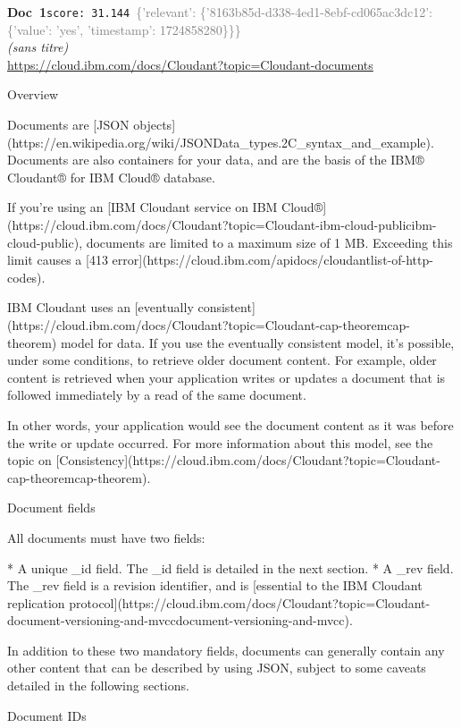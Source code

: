 \documentclass[a4paper,11pt]{article}
\begin{document}
\begin{docenv}
{\footnotesize\textcolor{doccolor}{\textbf{Doc~1}}}\hfill{\tiny\texttt{score:~31.144}}\ {\tiny\textcolor{gray}{\{'relevant': \{'8163b85d-d338-4ed1-8ebf-cd065ac3dc12': \{'value': 'yes', 'timestamp': 1724858280\}\}\}}}\\[3pt]
{\small\textit{(sans titre)}}\\[2pt]
{\tiny\url{https://cloud.ibm.com/docs/Cloudant?topic=Cloudant-documents}}\\[4pt]
{\footnotesize 
Overview 

Documents are [JSON objects](https://en.wikipedia.org/wiki/JSONData\_types.2C\_syntax\_and\_example). Documents are also containers for your data, and are the basis of the IBM® Cloudant® for IBM Cloud® database.

If you're using an [IBM Cloudant service on IBM Cloud®](https://cloud.ibm.com/docs/Cloudant?topic=Cloudant-ibm-cloud-publicibm-cloud-public), documents are limited to a maximum size of 1 MB. Exceeding this limit causes a [413 error](https://cloud.ibm.com/apidocs/cloudantlist-of-http-codes).

IBM Cloudant uses an [eventually consistent](https://cloud.ibm.com/docs/Cloudant?topic=Cloudant-cap-theoremcap-theorem) model for data. If you use the eventually consistent model, it's possible, under some conditions, to retrieve older document content. For example, older content is retrieved when your application writes or updates a document that is followed immediately by a read of the same document.

In other words, your application would see the document content as it was before the write or update occurred. For more information about this model, see the topic on [Consistency](https://cloud.ibm.com/docs/Cloudant?topic=Cloudant-cap-theoremcap-theorem).



 Document fields 

All documents must have two fields:



* A unique \_id field. The \_id field is detailed in the next section.
* A \_rev field. The \_rev field is a revision identifier, and is [essential to the IBM Cloudant replication protocol](https://cloud.ibm.com/docs/Cloudant?topic=Cloudant-document-versioning-and-mvccdocument-versioning-and-mvcc).



In addition to these two mandatory fields, documents can generally contain any other content that can be described by using JSON, subject to some caveats detailed in the following sections.



 Document IDs}
\end{docenv}
\end{document}
